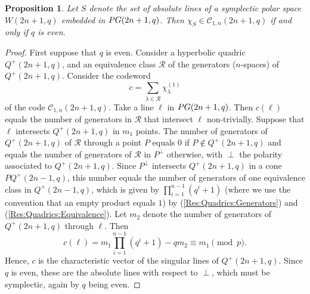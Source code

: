 \documentclass[a4paper]{article}
\newtheorem{prop}[thm]{Proposition}
\theoremstyle{definition}
\newcommand{\set}[1]{ \left \{ #1 \right \} }
\newcommand{\pg}{\textnormal{PG}}
\newcommand{\mq}{%
 Q}
\newcommand{\mc}{\mathcal C}
\newcommand{\mr}{\mathcal R}
\newcommand{\old}[1]{}%
\begin{document}
\old{\begin{prop}
 Let $S$ denote the set of absolute lines of a symplectic polar space $W(3,q)$ embedded in $\pg(3,q)$.
 Then $\chi_S \in \mc(3,q)$ if and only if $q$ is even.
\end{prop}}
\begin{prop}
 \label{Prop:Symplectic}
 Let $S$ denote the set of absolute lines of a symplectic polar space $W(2n+1,q)$ embedded in $\pg(2n+1,q)$. Then $\chi_S \in \mc_{1,n}(2n+1,q)$ if and only if $q$ is even.
\end{prop}

\begin{proof}
 \old{First suppose that $q$ is even.
 Consider a hyperbolic quadric $\mq^+(3,q)$, and a regulus $\mathcal R$ of lines contained in $\mq^+(3,q)$.
 Consider the codeword 
 \[
  c = \sum_{\ell \in \mathcal R} \chi_\ell
 \]
 of the code $C(q)$.
 Each point of $\mq^+(3,q)$ is contained in a unique line of $\mathcal R$.
 Take a line $\ell$ in $\pg(3,q)$.
 If $\ell$ intersects $\mq^+(3,q)$ in $k \in \set{0,1,2}$ points, then clearly $c\cdot \chi_\ell = k$.
 Otherwise, $\ell$ is completely contained in $\mq^+(3,q)$.
 Either $\ell$ belongs to $\mathcal R$, and $c\cdot \chi_\ell = 1$, or $\ell$ belongs to the opposite regulus and $c\cdot \chi_\ell = q+1 = 1$.
 Hence, $c$ is the characteristic vector of the singular lines of $\mq^+(3,q)$.
 Since $q$ is even, these are the absolute lines with respect to the polarity corresponding to $\mq^+(3,q)$, which must be symplectic, again by $q$ being even.}

 First suppose that $q$ is even.
 Consider a hyperbolic quadric $\mq^+(2n+1,q)$, and an equivalence class $\mathcal R$ of the generators (\(n\)-spaces) of $\mq^+(2n+1,q)$.
 Consider the codeword 
 \[
  c = \sum_{\lambda\in \mathcal R} \chi^{(1)}_{\lambda}
 \]
 of the code $\mc_{1,n}(2n+1,q)$.
 Take a line $\ell$ in $\pg(2n+1,q)$.
 Then $c(\ell)$ equals the number of generators in $\mr$ that intersect $\ell$ non-trivially.
 Suppose that $\ell$ intersects $Q^+(2n+1,q)$ in $m_1$ points.
 The number of generators of $Q^+(2n+1,q)$ of $\mr$ through a point $P$ equals 0 if $P \notin Q^+(2n+1,q)$ and equals the number of generators of $\mr$ in $P^\perp$ otherwise, with $\perp$ the polarity associated to $Q^+(2n+1,q)$.
 Since $P^\perp$ intersects $Q^+(2n+1,q)$ in a cone $P Q^+(2n-1,q)$, this number equals the number of generators of one equivalence class in $Q^+(2n-1,q)$, which is given by $\prod_{i=1}^{n-1} (q^i+1)$ (where we use the convention that an empty product equals $1$) by  (\ref{Res:Quadrics:Generators}) and (\ref{Res:Quadrics:Equivalence}).
 Let $m_2$ denote the number of generators of $Q^+(2n+1,q)$ through $\ell$.
 Then
 \[
  c(\ell) = m_1 \prod_{i=1}^{n-1} (q^i + 1) - q m_2 \equiv m_1 \pmod p.
 \]
 Hence, $c$ is the characteristic vector of the singular lines of $Q^+(2n+1,q)$.
 Since $q$ is even, these are the absolute lines with respect to $\perp$, which must be symplectic, again by $q$ being even.
 

\end{proof}
\end{document}
